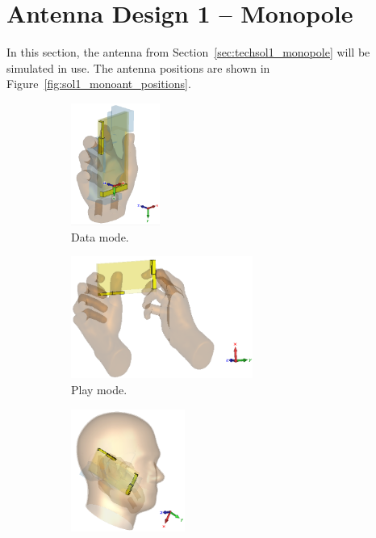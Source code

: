 \section{Antenna Design 1 -- Monopole}
In this section, the antenna from Section~\ref{sec:techsol1_monopole} will be simulated in use. The antenna positions are shown in Figure~\ref{fig:sol1_monoant_positions}.


\begin{figure}[htbp]
    \centering
    \begin{subfigure}[b]{0.24\linewidth}
        \centering \includegraphics[width=\linewidth,height=4cm,keepaspectratio]{img/tech_sol/monopole/data_mode/3d_data_mode.PNG}
        \caption{Data mode.}
    \end{subfigure}
    \begin{subfigure}[b]{0.24\linewidth}
        \centering \includegraphics[width=\linewidth,height=4cm,keepaspectratio]{img/tech_sol/monopole/play_mode/3d_play_mode.PNG}
        \caption{Play mode.}
    \end{subfigure}
    \begin{subfigure}[b]{0.24\linewidth}
        \centering \includegraphics[width=\linewidth,height=4cm,keepaspectratio]{img/tech_sol/monopole/talk_mode/3d_talk_mode.PNG}

\end{subfigure}
\end{figure}
